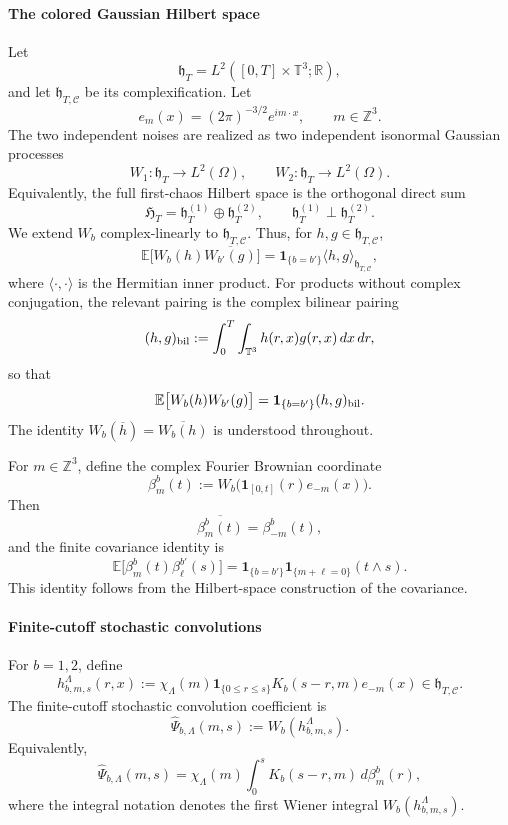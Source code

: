 \documentclass[10pt]{amsart}
\numberwithin{equation}{section}
\theoremstyle{plain}
\theoremstyle{definition}
\theoremstyle{remark}
\newcommand{\T}{\mathbb{T}}
\newcommand{\R}{\mathbb{R}}
\newcommand{\Z}{\mathbb{Z}}
\newcommand{\E}{\mathbb{E}}
\newcommand{\C}{\mathcal{C}}
\newcommand{\la}{\langle}
\newcommand{\ra}{\rangle}
\begin{document}
\paragraph{The colored Gaussian Hilbert space}

Let
\[
        \mathfrak h_T=L^2([0,T]\times\T^3;\R),
\]
and let \(\mathfrak h_{T,\C}\) be its complexification.  Let
\[
        e_m(x)=(2\pi)^{-3/2}e^{im\cdot x},
        \qquad m\in\Z^3.
\]
The two independent noises are realized as two independent isonormal Gaussian processes
\[
        W_1:\mathfrak h_T\to L^2(\Omega),
        \qquad
        W_2:\mathfrak h_T\to L^2(\Omega).
\]
Equivalently, the full first-chaos Hilbert space is the orthogonal direct sum
\[
        \mathfrak H_T=\mathfrak h_T^{(1)}\oplus\mathfrak h_T^{(2)},
        \qquad
        \mathfrak h_T^{(1)}\perp\mathfrak h_T^{(2)}.
\]
We extend \(W_b\) complex-linearly to \(\mathfrak h_{T,\C}\).  Thus, for \(h,g\in\mathfrak h_{T,\C}\),
\[
        \E\bigl[W_b(h)\overline{W_{b'}(g)}\bigr]
        =
        \mathbf 1_{\{b=b'\}}\la h,g\ra_{\mathfrak h_{T,\C}},
\]
where \(\la\cdot,\cdot\ra\) is the Hermitian inner product.  For products without complex conjugation, the relevant pairing is the complex bilinear pairing
\[
        (h,g)_{\rm bil}:=
        \int_0^T\int_{\T^3}h(r,x)g(r,x)\,dx\,dr,
\]
so that
\[
        \E\bigl[W_b(h)W_{b'}(g)\bigr]
        =
        \mathbf 1_{\{b=b'\}}(h,g)_{\rm bil}.
\]
The identity \(W_b(\overline h)=\overline{W_b(h)}\) is understood throughout.

For \(m\in\Z^3\), define the complex Fourier Brownian coordinate
\[
        \beta_m^b(t):=
        W_b\bigl(\mathbf 1_{[0,t]}(r)e_{-m}(x)\bigr).
\]
Then
\[
        \overline{\beta_m^b(t)}=\beta_{-m}^b(t),
\]
and the finite covariance identity is
\[
        \E\bigl[\beta_m^b(t)\beta_\ell^{b'}(s)\bigr]
        =
        \mathbf 1_{\{b=b'\}}\mathbf 1_{\{m+\ell=0\}}(t\wedge s).
\]
This identity follows from the Hilbert-space construction of the covariance.



\paragraph{Finite-cutoff stochastic convolutions}

For \(b=1,2\), define
\[
        h_{b,m,s}^{\Lambda}(r,x)
        :=
        \chi_\Lambda(m)\mathbf 1_{\{0\le r\le s\}}K_b(s-r,m)e_{-m}(x)
        \in\mathfrak h_{T,\C}.
\]
The finite-cutoff stochastic convolution coefficient is
\[
        \widehat\Psi_{b,\Lambda}(m,s):=W_b(h_{b,m,s}^{\Lambda}).
\]
Equivalently,
\[
        \widehat\Psi_{b,\Lambda}(m,s)
        =
        \chi_\Lambda(m)\int_0^s K_b(s-r,m)\,d\beta_m^b(r),
\]
where the integral notation denotes the first Wiener integral \(W_b(h_{b,m,s}^{\Lambda})\).
\end{document}

